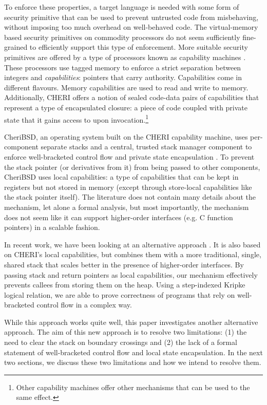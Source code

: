 \documentclass[sigplan, review]{acmart}
\begin{document}
To enforce these properties, a target language is needed with some form of security primitive that can be used to prevent untrusted code from misbehaving, without imposing too much overhead on well-behaved code.
The virtual-memory based security primitives on commodity processors do not seem sufficiently fine-grained to efficiently support this type of enforcement.
More suitable security primitives are offered by a type of processors known as capability machines \citep{levy_capability-based_1984,watson_cheri:_2015}.
These processors use tagged memory to enforce a strict separation between integers and \emph{capabilities}: pointers that carry authority.
Capabilities come in different flavours.
Memory capabilities are used to read and write to memory.
Additionally, CHERI offers a notion of sealed code-data pairs of capabilities that represent a type of encapsulated closure: a piece of code coupled with private state that it gains access to upon invocation.\footnote{Other capability machines offer other mechanisms that can be used to the same effect.} 

CheriBSD, an operating system built on the CHERI capability machine, uses per-component separate stacks and a central, trusted stack manager component to enforce well-bracketed control flow and private state encapsulation \citep{watson_cheri:_2015}.
To prevent the stack pointer (or derivatives from it) from being passed to other components, CheriBSD uses local capabilities: a type of capabilities that can be kept in registers but not stored in memory (except through store-local capabilities like the stack pointer itself).
The literature does not contain many details about the mechanism, let alone a formal analysis, but most importantly, the mechanism does not seem like it can support higher-order interfaces (e.g. C function pointers) in a scalable fashion.

In recent work, we have been looking at an alternative approach \citep{skorstengaard_reasoning_2017}.
It is also based on CHERI's local capabilities, but combines them with a more traditional, single, shared stack that scales better in the presence of higher-order interfaces.
By passing stack and return pointers as local capabilities, our mechanism effectively prevents callees from storing them on the heap.
Using a step-indexed Kripke logical relation, we are able to prove correctness of programs that rely on well-bracketed control flow in a complex way.

While this approach works quite well, this paper investigates another alternative approach.
The aim of this new approach is to resolve two limitations: (1) the need to clear the stack on boundary crossings and (2) the lack of a formal statement of well-bracketed control flow and local state encapsulation.
In the next two sections, we discuss these two limitations and how we intend to resolve them.
\end{document}
